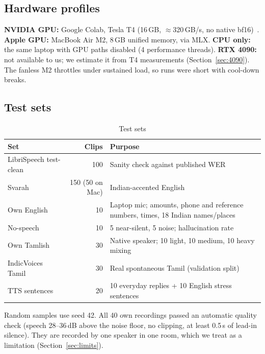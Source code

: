 \documentclass[conference]{IEEEtran}
\begin{document}
\subsection{Hardware profiles}
\textbf{NVIDIA GPU:} Google Colab, Tesla T4 (16\,GB, $\approx$320\,GB/s, no native bf16)~\cite{hw_t4}. \textbf{Apple GPU:} MacBook Air M2, 8\,GB unified memory, via MLX. \textbf{CPU only:} the same laptop with GPU paths disabled (4 performance threads). \textbf{RTX 4090:} not available to us; we estimate it from T4 measurements (Section~\ref{sec:4090}). The fanless M2 throttles under sustained load, so runs were short with cool-down breaks.

\subsection{Test sets}
\begin{table}[!t]
\caption{Test sets}
\label{tab:sets}
\footnotesize
\begin{tabularx}{\columnwidth}{@{}p{2.6cm} r X@{}}
\toprule
\textbf{Set} & \textbf{Clips} & \textbf{Purpose} \\
\midrule
LibriSpeech test-clean~\cite{panayotov2015librispeech,ds_esb} & 100 & Sanity check against published WER \\
Svarah~\cite{javed2023svarah,ds_svarah} & 150 (50 on Mac) & Indian-accented English \\
Own English & 10 & Laptop mic; amounts, phone and reference numbers, times, 18 Indian names/places \\
No-speech & 10 & 5 near-silent, 5 noise; hallucination rate \\
Own Tamlish & 30 & Native speaker; 10 light, 10 medium, 10 heavy mixing \\
IndicVoices Tamil~\cite{ds_indicvoices} & 30 & Real spontaneous Tamil (validation split) \\
TTS sentences & 20 & 10 everyday replies + 10 English stress sentences \\
\bottomrule
\end{tabularx}
\end{table}
Random samples use seed 42. All 40 own recordings passed an automatic quality check (speech 28--36\,dB above the noise floor, no clipping, at least 0.5\,s of lead-in silence). They are recorded by one speaker in one room, which we treat as a limitation (Section~\ref{sec:limits}).
\end{document}
